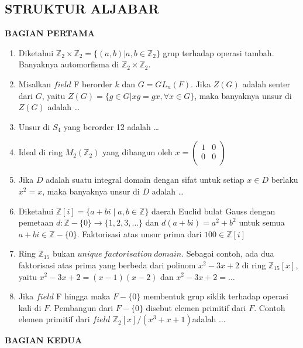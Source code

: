 \documentclass[12pt,twoside]{article}
\begin{document}
\newpage \subsection{STRUKTUR ALJABAR}
\textbf{BAGIAN PERTAMA}
\begin{enumerate}
	\item Diketahui $\mathbb{Z}_2\times\mathbb{Z}_2=\{(a,b)|a,b\in \mathbb{Z}_2\}$ grup terhadap operasi tambah. Banyaknya automorfisma di $\mathbb{Z}_2\times\mathbb{Z}_2$.

	\item Misalkan $field$ F berorder  $k$ dan $G=GL_n(F)$. Jika $Z(G)$ adalah senter dari $G$, yaitu  $Z(G)=\{g\in G|xg=gx,\forall x\in G \}$, maka banyaknya unsur di $Z(G)$ adalah \dots

	\item Unsur di $S_4$ yang berorder 12 adalah \dots

	\item Ideal di ring $M_2(\mathbb{Z}_2)$ yang dibangun oleh $x=\left(\begin{array}{ll}
				      1 & 0 \\0&0\\
			      \end{array}\right)$

	\item Jika $D$ adalah suatu integral domain dengan sifat untuk setiap $x\in D$ berlaku $x^2=x$, maka banyaknya unsur di $D$ adalah \dots

	\item Diketahui $\mathbb{Z}\left[i\right]=\{a+bi\mid a,b\in\mathbb{Z}\}$ daerah Euclid bulat Gauss dengan pemetaan $d:\mathbb{Z}-\{0\}\to \{1,2,3,\dots\}$ dan $d(a+bi)=a^2+b^2$ untuk semua $a+bi\in \mathbb{Z}-\{0\}$. Faktorisasi atas unsur prima dari $100\in \mathbb{Z}\left[i\right]$

	\item Ring $\mathbb{Z}_{15}$ bukan $unique~ factorisation~domain$. Sebagai contoh, ada dua faktorisasi atas prima yang berbeda dari polinom $x^2-3x+2$ di ring $\mathbb{Z}_{15}[x]$, yaitu $x^2-3x+2=(x-1)(x-2)$ dan $x^2-3x+2=\dots$

	\item Jika $field$ F hingga maka $F-\{0\}$ membentuk grup siklik terhadap operasi kali di $F$. Pembangun dari $F-\{0\}$ disebut elemen primitif dari $F$. Contoh elemen primitif dari $field$ $\mathbb{Z}_2[x]/(x^3+x+1)$adalah $\dots$

\end{enumerate}
\newpage \textbf{BAGIAN KEDUA}
\end{document}
